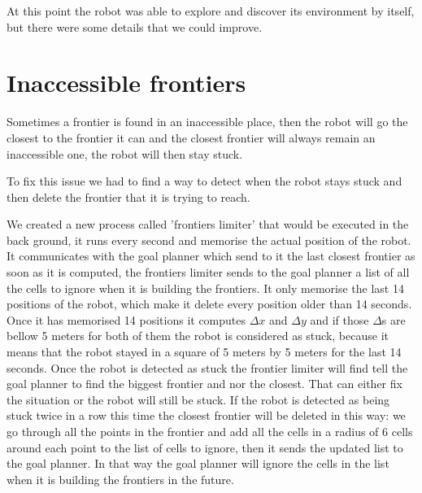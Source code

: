At this point the robot was able to explore and discover its environment by itself, but there were some details that we could improve.

\section{Inaccessible frontiers}

Sometimes a frontier is found in an inaccessible place, then the robot will go the closest to the frontier it can and the closest frontier will always remain an inaccessible one, the robot will then stay stuck.

To fix this issue we had to find a way to detect when the robot stays stuck and then delete the frontier that it is trying to reach.

We created a new process called 'frontiers limiter' that would be executed in the back ground, it runs every second and memorise the actual position of the robot.
It communicates with the goal planner which send to it the last closest frontier as soon as it is computed, the frontiers limiter sends to the goal planner a list of all the cells to ignore when it is building the frontiers.
It only memorise the last 14 positions of the robot, which make it delete every position older than 14 seconds.
Once it has memorised 14 positions it computes $\Delta x$ and $\Delta y$ and if those $\Delta$s are bellow 5 meters for both of them the robot is considered as stuck, because it means that the robot stayed in a square of 5 meters by 5 meters for the last 14 seconds.
Once the robot is detected as stuck the frontier limiter will find tell the goal planner to find the biggest frontier and nor the closest.
That can either fix the situation or the robot will still be stuck.
If the robot is detected as being stuck twice in a row this time the closest frontier will be deleted in this way: we go through all the points in the frontier and add all the cells in a radius of 6 cells around each point to the list of cells to ignore, then it sends the updated list to the goal planner.
In that way the goal planner will ignore the cells in the list when it is building the frontiers in the future.

